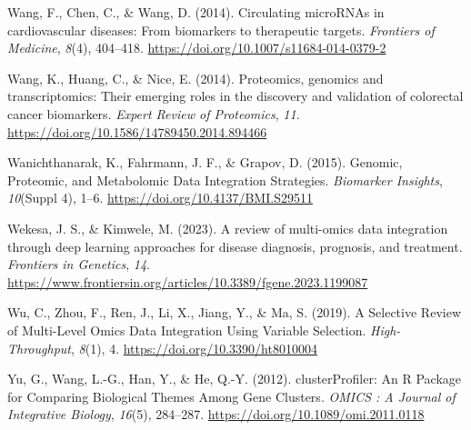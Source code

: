 \documentclass[a4paper, nobind]{templates/ociamthesis}
\newlength{\cslhangindent}
\newenvironment{CSLReferences}[2] %
 {%
  \setlength{\parindent}{0pt}
  \ifodd #1
  \let\oldpar\par
  \def\par{\hangindent=\cslhangindent\oldpar}
  \fi
  \setlength{\parskip}{1mm}
  \setlength{\baselineskip}{6mm}
 }%
 {}
\begin{document}
\begin{CSLReferences}{1}{0}
\leavevmode{}%
Wang, F., Chen, C., \& Wang, D. (2014). Circulating {microRNAs} in cardiovascular diseases: From biomarkers to therapeutic targets. \emph{Frontiers of Medicine}, \emph{8}(4), 404--418. \url{https://doi.org/10.1007/s11684-014-0379-2}

\leavevmode{}%
Wang, K., Huang, C., \& Nice, E. (2014). Proteomics, genomics and transcriptomics: {Their} emerging roles in the discovery and validation of colorectal cancer biomarkers. \emph{Expert Review of Proteomics}, \emph{11}. \url{https://doi.org/10.1586/14789450.2014.894466}

\leavevmode{}%
Wanichthanarak, K., Fahrmann, J. F., \& Grapov, D. (2015). Genomic, {Proteomic}, and {Metabolomic} {Data} {Integration} {Strategies}. \emph{Biomarker Insights}, \emph{10}(Suppl 4), 1--6. \url{https://doi.org/10.4137/BMI.S29511}

\leavevmode{}%
Wekesa, J. S., \& Kimwele, M. (2023). A review of multi-omics data integration through deep learning approaches for disease diagnosis, prognosis, and treatment. \emph{Frontiers in Genetics}, \emph{14}. \url{https://www.frontiersin.org/articles/10.3389/fgene.2023.1199087}

\leavevmode{}%
Wu, C., Zhou, F., Ren, J., Li, X., Jiang, Y., \& Ma, S. (2019). A {Selective} {Review} of {Multi}-{Level} {Omics} {Data} {Integration} {Using} {Variable} {Selection}. \emph{High-Throughput}, \emph{8}(1), 4. \url{https://doi.org/10.3390/ht8010004}

\leavevmode{}%
Yu, G., Wang, L.-G., Han, Y., \& He, Q.-Y. (2012). {clusterProfiler}: An {R} {Package} for {Comparing} {Biological} {Themes} {Among} {Gene} {Clusters}. \emph{OMICS : A Journal of Integrative Biology}, \emph{16}(5), 284--287. \url{https://doi.org/10.1089/omi.2011.0118}

\end{CSLReferences}

\end{document}
